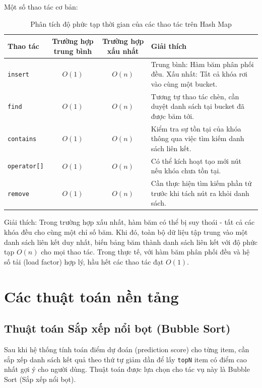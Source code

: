 \documentclass{report}
\begin{document}
Một số thao tác cơ bản:

\begin{table}[H]
    \centering
    \renewcommand{\arraystretch}{1.4}
    \begin{tabularx}{\textwidth}{|l|c|c|>{\raggedright\arraybackslash}X|}
        \hline
        \textbf{Thao tác} & \textbf{Trường hợp trung bình} & \textbf{Trường hợp xấu nhất} & \textbf{Giải thích} \\ \hline
        \texttt{insert} & $O(1)$ & $O(n)$ & Trung bình: Hàm băm phân phối đều. Xấu nhất: Tất cả khóa rơi vào cùng một bucket. \\ \hline
        \texttt{find} & $O(1)$ & $O(n)$ & Tương tự thao tác chèn, cần duyệt danh sách tại bucket đã được băm tới. \\ \hline
        \texttt{contains} & $O(1)$ & $O(n)$ & Kiểm tra sự tồn tại của khóa thông qua việc tìm kiếm danh sách liên kết. \\ \hline
        \texttt{operator[]} & $O(1)$ & $O(n)$ & Có thể kích hoạt tạo mới nút nếu khóa chưa tồn tại. \\ \hline
        \texttt{remove} & $O(1)$ & $O(n)$ & Cần thực hiện tìm kiếm phần tử trước khi tách nút ra khỏi danh sách. \\ \hline
    \end{tabularx}
    \caption{Phân tích độ phức tạp thời gian của các thao tác trên Hash Map}
    \label{tab:do_phuc_tap_hashmap}
\end{table}

Giải thích: Trong trường hợp xấu nhất, hàm băm có thể bị suy thoái - tất cả các khóa đều cho cùng một chỉ số băm. Khi đó, toàn bộ dữ liệu tập trung vào một danh sách liên kết duy nhất, biến bảng băm thành danh sách liên kết với độ phức tạp $O(n)$ cho mọi thao tác. Trong thực tế, với hàm băm phân phối đều và hệ số tải (load factor) hợp lý, hầu hết các thao tác đạt $O(1)$.

\section{Các thuật toán nền tảng}

\subsection{Thuật toán Sắp xếp nổi bọt (Bubble Sort)}

Sau khi hệ thống tính toán điểm dự đoán (prediction score) cho từng item, cần sắp xếp danh sách kết quả theo thứ tự giảm dần để lấy \texttt{topN} item có điểm cao nhất gợi ý cho người dùng. Thuật toán được lựa chọn cho tác vụ này là Bubble Sort (Sắp xếp nổi bọt).
\end{document}
